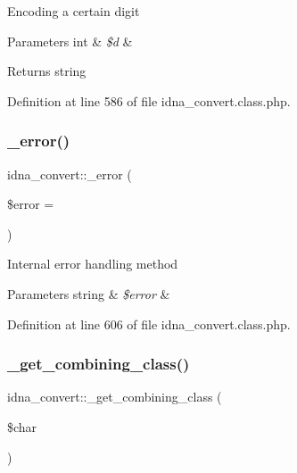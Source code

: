 Encoding a certain digit 
\begin{DoxyParams}[1]{Parameters}
int & {\em \$d} & \\
\hline
\end{DoxyParams}
\begin{DoxyReturn}{Returns}
string 
\end{DoxyReturn}


Definition at line 586 of file idna\+\_\+convert.\+class.\+php.

\mbox{\label{classidna__convert_a1a9abb3bcbd4425a4b1c013f50ab757b}} 
\subsubsection{\texorpdfstring{\+\_\+error()}{\_error()}}
{\footnotesize\ttfamily idna\+\_\+convert\+::\+\_\+error (\begin{DoxyParamCaption}\item[{}]{\$error = {\ttfamily \textquotesingle{}\textquotesingle{}} }\end{DoxyParamCaption})\hspace{0.3cm}{\ttfamily [protected]}}

Internal error handling method 
\begin{DoxyParams}[1]{Parameters}
string & {\em \$error} & \\
\hline
\end{DoxyParams}


Definition at line 606 of file idna\+\_\+convert.\+class.\+php.

\mbox{\label{classidna__convert_abd868ffb75c0d7633998ab14f6621dd3}} 
\subsubsection{\texorpdfstring{\+\_\+get\+\_\+combining\+\_\+class()}{\_get\_combining\_class()}}
{\footnotesize\ttfamily idna\+\_\+convert\+::\+\_\+get\+\_\+combining\+\_\+class (\begin{DoxyParamCaption}\item[{}]{\$char }\end{DoxyParamCaption})\hspace{0.3cm}{\ttfamily [protected]}}

